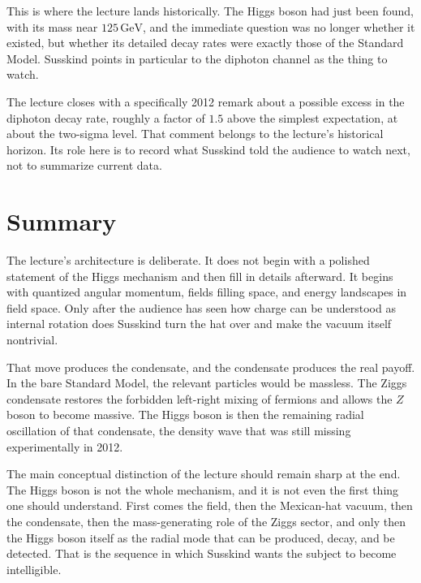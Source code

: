 This is where the lecture lands historically. The Higgs boson had just been found, with its mass near \(125\,\mathrm{GeV}\), and the immediate question was no longer whether it existed, but whether its detailed decay rates were exactly those of the Standard Model. Susskind points in particular to the diphoton channel as the thing to watch.

\begin{remark}
The lecture closes with a specifically 2012 remark about a possible excess in the diphoton decay rate, roughly a factor of \(1.5\) above the simplest expectation, at about the two-sigma level. That comment belongs to the lecture's historical horizon. Its role here is to record what Susskind told the audience to watch next, not to summarize current data.
\end{remark}

\section{Summary}

The lecture's architecture is deliberate. It does not begin with a polished statement of the Higgs mechanism and then fill in details afterward. It begins with quantized angular momentum, fields filling space, and energy landscapes in field space. Only after the audience has seen how charge can be understood as internal rotation does Susskind turn the hat over and make the vacuum itself nontrivial.

That move produces the condensate, and the condensate produces the real payoff. In the bare Standard Model, the relevant particles would be massless. The Ziggs condensate restores the forbidden left-right mixing of fermions and allows the \(Z\) boson to become massive. The Higgs boson is then the remaining radial oscillation of that condensate, the density wave that was still missing experimentally in 2012.

The main conceptual distinction of the lecture should remain sharp at the end. The Higgs boson is not the whole mechanism, and it is not even the first thing one should understand. First comes the field, then the Mexican-hat vacuum, then the condensate, then the mass-generating role of the Ziggs sector, and only then the Higgs boson itself as the radial mode that can be produced, decay, and be detected. That is the sequence in which Susskind wants the subject to become intelligible.